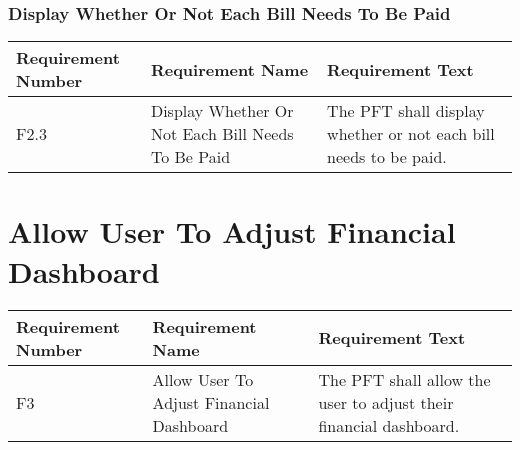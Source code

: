 \documentclass{article}
\begin{document}
\subsubsection{Display Whether Or Not Each Bill Needs To Be Paid}

\begin{longtable}{|p{2cm}|p{6cm}| p{6cm}|}
    \hline
    \textbf{Requirement Number} & \textbf{Requirement Name} & \textbf{Requirement Text}\\
    \hline
    F2.3 & Display Whether Or Not Each Bill Needs To Be Paid & The PFT shall display whether or not each bill needs to be paid.  \\
    \hline
\end{longtable}

\section{Allow User To Adjust Financial Dashboard}

\begin{longtable}{|p{2cm}|p{6cm}| p{6cm}|}
    \hline
    \textbf{Requirement Number} & \textbf{Requirement Name} & \textbf{Requirement Text}\\
    \hline
    F3 & Allow User To Adjust Financial Dashboard & The PFT shall allow the user to adjust their financial dashboard.  \\
    \hline
\end{longtable}
\end{document}
